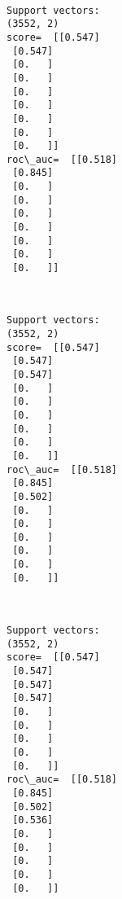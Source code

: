 \documentclass[11pt]{article}
\begin{document}
    \begin{center}
    \end{center}
    { \hspace*{\fill} \\}
    
    \begin{Verbatim}[commandchars=\\\{\}]
Support vectors:
(3552, 2)
score=  [[0.547]
 [0.547]
 [0.   ]
 [0.   ]
 [0.   ]
 [0.   ]
 [0.   ]
 [0.   ]
 [0.   ]]
roc\_auc=  [[0.518]
 [0.845]
 [0.   ]
 [0.   ]
 [0.   ]
 [0.   ]
 [0.   ]
 [0.   ]
 [0.   ]]

    \end{Verbatim}

    \begin{center}
    \end{center}
    { \hspace*{\fill} \\}
    
    \begin{Verbatim}[commandchars=\\\{\}]
Support vectors:
(3552, 2)
score=  [[0.547]
 [0.547]
 [0.547]
 [0.   ]
 [0.   ]
 [0.   ]
 [0.   ]
 [0.   ]
 [0.   ]]
roc\_auc=  [[0.518]
 [0.845]
 [0.502]
 [0.   ]
 [0.   ]
 [0.   ]
 [0.   ]
 [0.   ]
 [0.   ]]

    \end{Verbatim}

    \begin{center}
    \end{center}
    { \hspace*{\fill} \\}
    
    \begin{Verbatim}[commandchars=\\\{\}]
Support vectors:
(3552, 2)
score=  [[0.547]
 [0.547]
 [0.547]
 [0.547]
 [0.   ]
 [0.   ]
 [0.   ]
 [0.   ]
 [0.   ]]
roc\_auc=  [[0.518]
 [0.845]
 [0.502]
 [0.536]
 [0.   ]
 [0.   ]
 [0.   ]
 [0.   ]
 [0.   ]]

    \end{Verbatim}

    \begin{center}
    \end{center}
    { \hspace*{\fill} \\}
    
\end{document}
